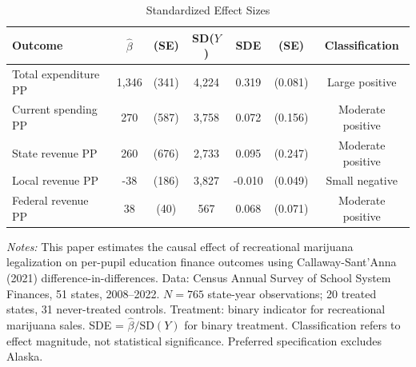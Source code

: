 
\begin{table}[htbp]
\centering
\caption{Standardized Effect Sizes}
\label{tab:sde}
\small
\begin{tabular}{lcccccc}
\hline\hline
Outcome & $\hat{\beta}$ & (SE) & SD($Y$) & SDE & (SE) & Classification \\
\hline
Total expenditure PP & 1,346 & (341) & 4,224 & 0.319 & (0.081) & Large positive \\
Current spending PP & 270 & (587) & 3,758 & 0.072 & (0.156) & Moderate positive \\
State revenue PP & 260 & (676) & 2,733 & 0.095 & (0.247) & Moderate positive \\
Local revenue PP & -38 & (186) & 3,827 & -0.010 & (0.049) & Small negative \\
Federal revenue PP & 38 & (40) & 567 & 0.068 & (0.071) & Moderate positive \\
\hline\hline
\end{tabular}
\begin{tablenotes}
\small
\item \textit{Notes:} This paper estimates the causal effect of recreational marijuana legalization on per-pupil education finance outcomes using Callaway-Sant'Anna (2021) difference-in-differences. Data: Census Annual Survey of School System Finances, 51 states, 2008--2022. $N=765$ state-year observations; 20 treated states, 31 never-treated controls. Treatment: binary indicator for recreational marijuana sales. SDE = $\hat{\beta} / \text{SD}(Y)$ for binary treatment. Classification refers to effect magnitude, not statistical significance. Preferred specification excludes Alaska.
\end{tablenotes}
\end{table}

